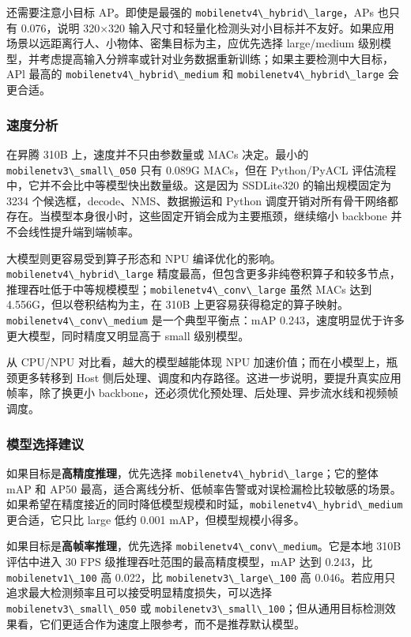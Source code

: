 还需要注意小目标 AP。即使是最强的
\passthrough{\lstinline!mobilenetv4\_hybrid\_large!}，APs 也只有
0.076，说明 320×320
输入尺寸和轻量化检测头对小目标并不友好。如果应用场景以远距离行人、小物体、密集目标为主，应优先选择
large/medium
级别模型，并考虑提高输入分辨率或针对业务数据重新训练；如果主要检测中大目标，APl
最高的 \passthrough{\lstinline!mobilenetv4\_hybrid\_medium!} 和
\passthrough{\lstinline!mobilenetv4\_hybrid\_large!} 会更合适。

\subsubsection{速度分析}\label{ux901fux5ea6ux5206ux6790}

在昇腾 310B 上，速度并不只由参数量或 MACs 决定。最小的
\passthrough{\lstinline!mobilenetv3\_small\_050!} 只有 0.089G MACs，但在
Python/PyACL 评估流程中，它并不会比中等模型快出数量级。这是因为
SSDLite320 的输出规模固定为 3234 个候选框，decode、NMS、数据搬运和
Python
调度开销对所有骨干网络都存在。当模型本身很小时，这些固定开销会成为主要瓶颈，继续缩小
backbone 并不会线性提升端到端帧率。

大模型则更容易受到算子形态和 NPU
编译优化的影响。\passthrough{\lstinline!mobilenetv4\_hybrid\_large!}
精度最高，但包含更多非纯卷积算子和较多节点，推理吞吐低于中等规模模型；\passthrough{\lstinline!mobilenetv4\_conv\_large!}
虽然 MACs 达到 4.556G，但以卷积结构为主，在 310B
上更容易获得稳定的算子映射。\passthrough{\lstinline!mobilenetv4\_conv\_medium!}
是一个典型平衡点：mAP
0.243，速度明显优于许多更大模型，同时精度又明显高于 small 级别模型。

从 CPU/NPU 对比看，越大的模型越能体现 NPU
加速价值；而在小模型上，瓶颈更多转移到 Host
侧后处理、调度和内存路径。这进一步说明，要提升真实应用帧率，除了换更小
backbone，还必须优化预处理、后处理、异步流水线和视频帧调度。

\subsubsection{模型选择建议}\label{ux6a21ux578bux9009ux62e9ux5efaux8bae}

如果目标是\textbf{高精度推理}，优先选择
\passthrough{\lstinline!mobilenetv4\_hybrid\_large!}；它的整体 mAP 和
AP50
最高，适合离线分析、低帧率告警或对误检漏检比较敏感的场景。如果希望在精度接近的同时降低模型规模和时延，\passthrough{\lstinline!mobilenetv4\_hybrid\_medium!}
更合适，它只比 large 低约 0.001 mAP，但模型规模小得多。

如果目标是\textbf{高帧率推理}，优先选择
\passthrough{\lstinline!mobilenetv4\_conv\_medium!}。它是本地 310B
评估中进入 30 FPS 级推理吞吐范围的最高精度模型，mAP 达到 0.243，比
\passthrough{\lstinline!mobilenetv1\_100!} 高 0.022，比
\passthrough{\lstinline!mobilenetv3\_large\_100!} 高
0.046。若应用只追求最大检测频率且可以接受明显精度损失，可以选择
\passthrough{\lstinline!mobilenetv3\_small\_050!} 或
\passthrough{\lstinline!mobilenetv3\_small\_100!}；但从通用目标检测效果看，它们更适合作为速度上限参考，而不是推荐默认模型。

